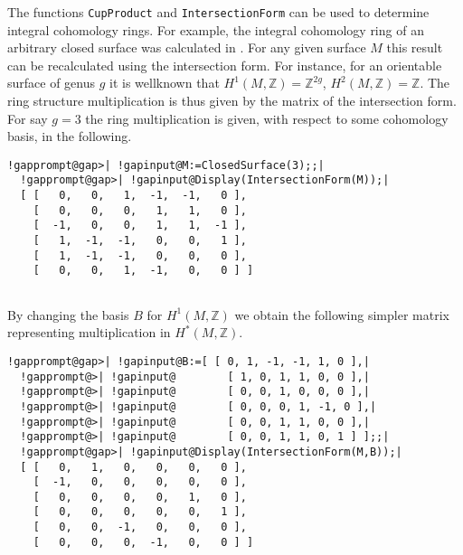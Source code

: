\documentclass[a4paper,11pt]{report}
\begin{document}
{{\begin{Verbatim}[commandchars=!@|,fontsize=\small,frame=single,label=Example]
\end{Verbatim}
 

The functions \texttt{CupProduct} and \texttt{IntersectionForm} can be used to determine integral cohomology rings. For example, the integral
cohomology ring of an arbitrary closed surface was calculated in \cite[Theorem 3.5]{goncalves}. For any given surface $M$ this result can be recalculated using the intersection form. For instance, for
an orientable surface of genus $g$ it is well\texttt{}known that $H^1(M,\mathbb Z)=\mathbb Z^{2g}$, $H^2(M,\mathbb Z)=\mathbb Z$. The ring structure multiplication is thus given by the matrix of the
intersection form. For say $g=3$ the ring multiplication is given, with respect to some cohomology basis, in
the following. 
\begin{Verbatim}[commandchars=!@|,fontsize=\small,frame=single,label=Example]
  !gapprompt@gap>| !gapinput@M:=ClosedSurface(3);;|
  !gapprompt@gap>| !gapinput@Display(IntersectionForm(M));|
  [ [   0,   0,   1,  -1,  -1,   0 ],
    [   0,   0,   0,   1,   1,   0 ],
    [  -1,   0,   0,   1,   1,  -1 ],
    [   1,  -1,  -1,   0,   0,   1 ],
    [   1,  -1,  -1,   0,   0,   0 ],
    [   0,   0,   1,  -1,   0,   0 ] ]
  
\end{Verbatim}
 By changing the basis $B$ for $H^1(M,\mathbb Z)$ we obtain the following simpler matrix representing multiplication in $H^\ast(M,\mathbb Z)$. 
\begin{Verbatim}[commandchars=!@|,fontsize=\small,frame=single,label=Example]
  !gapprompt@gap>| !gapinput@B:=[ [ 0, 1, -1, -1, 1, 0 ],|
  !gapprompt@>| !gapinput@        [ 1, 0, 1, 1, 0, 0 ],|
  !gapprompt@>| !gapinput@        [ 0, 0, 1, 0, 0, 0 ],|
  !gapprompt@>| !gapinput@        [ 0, 0, 0, 1, -1, 0 ],|
  !gapprompt@>| !gapinput@        [ 0, 0, 1, 1, 0, 0 ],|
  !gapprompt@>| !gapinput@        [ 0, 0, 1, 1, 0, 1 ] ];;|
  !gapprompt@gap>| !gapinput@Display(IntersectionForm(M,B));|
  [ [   0,   1,   0,   0,   0,   0 ],
    [  -1,   0,   0,   0,   0,   0 ],
    [   0,   0,   0,   0,   1,   0 ],
    [   0,   0,   0,   0,   0,   1 ],
    [   0,   0,  -1,   0,   0,   0 ],
    [   0,   0,   0,  -1,   0,   0 ] ]
  
\end{Verbatim}
 }

 
}
\end{document}
